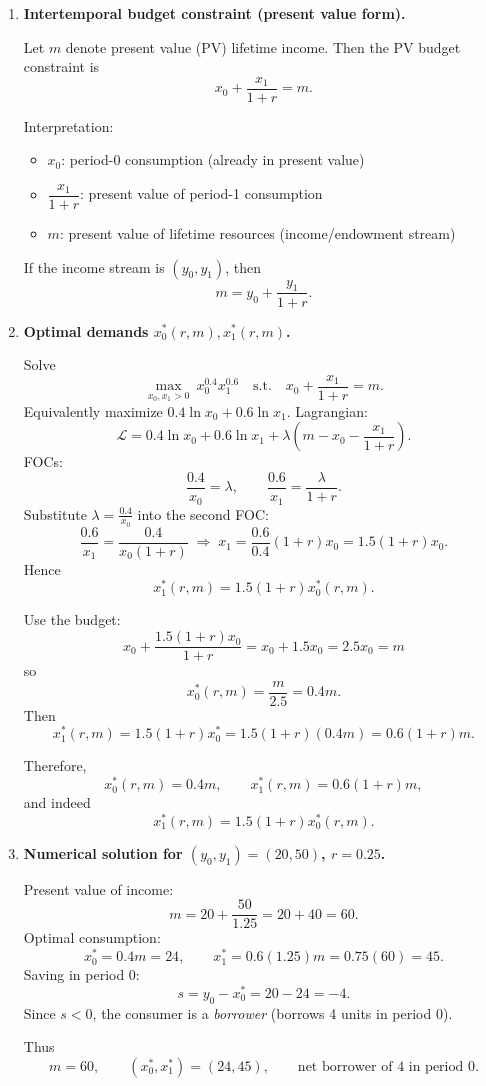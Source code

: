 \documentclass[12pt]{article}
\begin{document}
\begin{enumerate}[label=(\alph*)]
\item \textbf{Intertemporal budget constraint (present value form).}

Let \(m\) denote present value (PV) lifetime income. Then the PV budget constraint is
\[
\boxed{x_0+\frac{x_1}{1+r}=m.}
\]

Interpretation:
\begin{itemize}
\item \(x_0\): period-0 consumption (already in present value)
\item \(\dfrac{x_1}{1+r}\): present value of period-1 consumption
\item \(m\): present value of lifetime resources (income/endowment stream)
\end{itemize}

If the income stream is \((y_0,y_1)\), then
\[
\boxed{m=y_0+\frac{y_1}{1+r}.}
\]

\item \textbf{Optimal demands \(x_0^*(r,m),x_1^*(r,m)\).}

Solve
\[
\max_{x_0,x_1>0} \ x_0^{0.4}x_1^{0.6}
\quad \text{s.t.}\quad
x_0+\frac{x_1}{1+r}=m.
\]
Equivalently maximize \(0.4\ln x_0+0.6\ln x_1\). Lagrangian:
\[
\mathcal L=0.4\ln x_0+0.6\ln x_1+\lambda\!\left(m-x_0-\frac{x_1}{1+r}\right).
\]
FOCs:
\[
\frac{0.4}{x_0}=\lambda,\qquad
\frac{0.6}{x_1}=\frac{\lambda}{1+r}.
\]
Substitute \(\lambda=\frac{0.4}{x_0}\) into the second FOC:
\[
\frac{0.6}{x_1}=\frac{0.4}{x_0(1+r)}
\;\Longrightarrow\;
x_1=\frac{0.6}{0.4}(1+r)x_0
=1.5(1+r)x_0.
\]
Hence
\[
\boxed{x_1^*(r,m)=1.5(1+r)x_0^*(r,m).}
\]

Use the budget:
\[
x_0+\frac{1.5(1+r)x_0}{1+r}=x_0+1.5x_0=2.5x_0=m
\]
so
\[
x_0^*(r,m)=\frac{m}{2.5}=0.4m.
\]
Then
\[
x_1^*(r,m)=1.5(1+r)x_0^*=1.5(1+r)(0.4m)=0.6(1+r)m.
\]

Therefore,
\[
\boxed{x_0^*(r,m)=0.4m,\qquad x_1^*(r,m)=0.6(1+r)m,}
\]
and indeed
\[
\boxed{x_1^*(r,m)=1.5(1+r)x_0^*(r,m).}
\]

\item \textbf{Numerical solution for \((y_0,y_1)=(20,50)\), \(r=0.25\).}

Present value of income:
\[
m=20+\frac{50}{1.25}=20+40=60.
\]
Optimal consumption:
\[
x_0^*=0.4m=24,\qquad
x_1^*=0.6(1.25)m=0.75(60)=45.
\]
Saving in period 0:
\[
s=y_0-x_0^*=20-24=-4.
\]
Since \(s<0\), the consumer is a \emph{borrower} (borrows 4 units in period 0).

Thus
\[
\boxed{m=60,\qquad (x_0^*,x_1^*)=(24,45),\qquad \text{net borrower of }4\text{ in period 0}.}
\]


\end{enumerate}
\end{document}
